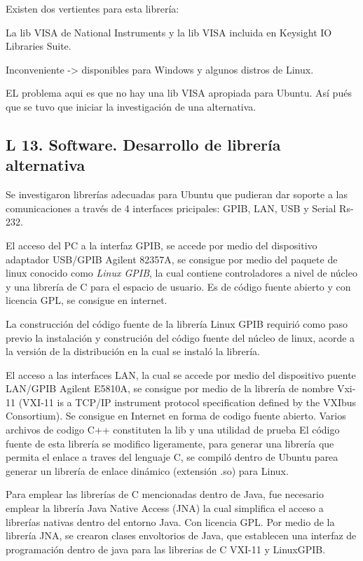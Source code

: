 \documentclass[paper=letter,oneside,fontsize=9pt]{scrartcl}
\begin{document}
	Existen dos vertientes para esta librería:
	
	La lib VISA de National Instruments y la lib VISA incluida en Keysight IO Libraries Suite. 
	
	Inconveniente -> disponibles para Windows y algunos distros de Linux.
	
	EL problema aqui es que no hay una lib VISA apropiada para Ubuntu. Así pués que se tuvo que iniciar la investigación de una alternativa.
	
	\subsection{L 13. Software. Desarrollo de librería alternativa}
	
	Se investigaron librerías adecuadas para Ubuntu que pudieran dar soporte a las comunicaciones a través de 4 interfaces pricipales: GPIB, LAN, USB y Serial Rs-232.
	
	El acceso del PC a la interfaz GPIB, se accede por medio del dispositivo adaptador USB/GPIB Agilent 82357A, se consigue por medio del paquete de linux conocido como \emph{Linux GPIB}, la cual contiene controladores a nivel de núcleo y una librería de C para el espacio de usuario.  Es de código fuente abierto y con licencia GPL, se consigue en internet.
	
	La construcción del código fuente de la librería Linux GPIB requirió como paso previo la instalación y construción del código fuente del núcleo de linux, acorde a la versión de la distribución en la cual se instaló la librería.		
	
	El acceso a las interfaces LAN, la cual se accede por medio del dispositivo puente LAN/GPIB Agilent E5810A, se consigue por medio de la librería de nombre Vxi-11 (VXI-11 is a TCP/IP instrument protocol specification defined by the VXIbus Consortium). Se consigue en Internet en forma de codigo fuente abierto. Varios archivos de codigo C++ constituten la lib y una utilidad de prueba El código fuente de esta librería se modifico ligeramente, para generar una librería que permita el enlace a traves del lenguaje C, se compiló dentro de Ubuntu parea generar un librería de  enlace dinámico  (extensión .so)  para Linux.	
	
	Para emplear las librerías de C mencionadas dentro de Java, fue necesario emplear la librería Java Native Access (JNA) la cual simplifica el acceso a librerías nativas dentro del entorno Java. Con licencia GPL. Por medio de la librería JNA, se crearon clases envoltorios de Java, que establecen una interfaz de programación dentro de java para las librerias de C VXI-11 y LinuxGPIB.
	
\end{document}
